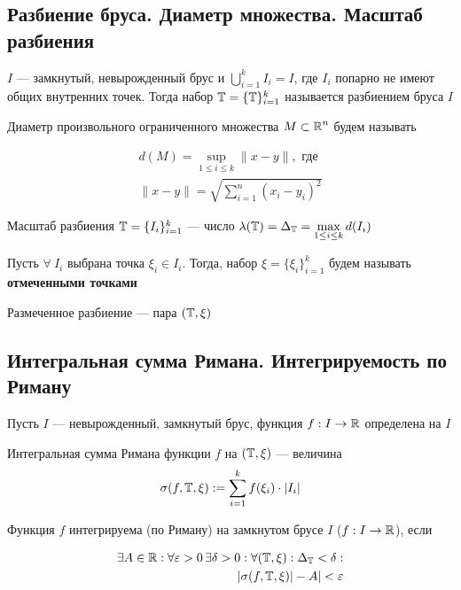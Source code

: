 \subsection{Разбиение бруса. Диаметр множества. Масштаб разбиения}

 \label{1.3} $I$ — замкнутый, невырожденный брус и $\displaystyle\bigcup_{i=1}^kI_i = I$, где $I_i$ попарно не имеют общих внутренних точек. Тогда набор $\operatorname{\mathbb{T}} = \{\operatorname{\mathbb{T}}\}_{i=1}^k$ называется разбиением бруса $I$

 \label{1.4} Диаметр произвольного ограниченного множества $M\subset\operatorname{\mathbb{R}}^n$ будем называть 

\begin{equation*}
\begin{aligned}
    d(M) = \displaystyle\sup_{1\leq i\leq k}\|x-y\|,\text{ где}\\
    \|x-y\|=\sqrt{\sum_{i=1}^{n}\left(x_i-y_i\right)^2}
\end{aligned}
\end{equation*}

 \label{1.5} Масштаб разбиения $\operatorname{\mathbb{T}}=\{I_i\}_{i=1}^k$ — число $\lambda(\operatorname{\mathbb{T}}) = \Delta_{\operatorname{\mathbb{T}}} = \displaystyle\max_{1\le i\le k} d(I_i)$

 \label{1.6} Пусть $\forall\ I_i$ выбрана точка $\xi_i\in I_i$. Тогда, набор $\xi = \{\xi_i\}_{i=1}^k$ будем называть \textbf{отмеченными точками}

 \label{1.7} Размеченное разбиение — пара $(\operatorname{\mathbb{T}}, \xi)$

\subsection{Интегральная сумма Римана. Интегрируемость по Риману}
Пусть $I$ — невырожденный, замкнутый брус, функция $f: I\rightarrow \operatorname{\mathbb{R}}$ определена на $I$

 \label{1.8} Интегральная сумма Римана функции $f$ на $(\operatorname{\mathbb{T}}, \xi)$ — величина
$$\sigma(f, \T, \xi) := \sum_{i=1}^kf(\xi_i)\cdot|I_i|$$

 \label{1.9} Функция $f$ интегрируема (по Риману) на замкнутом брусе $I$ ($f:I\rightarrow\operatorname{\mathbb{R}}$), если 

\begin{equation*}
\begin{aligned}
    \exists A\in\operatorname{\mathbb{R}}: \forall \varepsilon > 0\, \exists \delta > 0: \forall(\operatorname{\mathbb{T}}, \xi): \Delta_{\operatorname{\mathbb{T}}} < \delta:\\
    |\sigma(f, \operatorname{\mathbb{T}}, \xi)| - A| < \varepsilon
\end{aligned}
\end{equation*}

